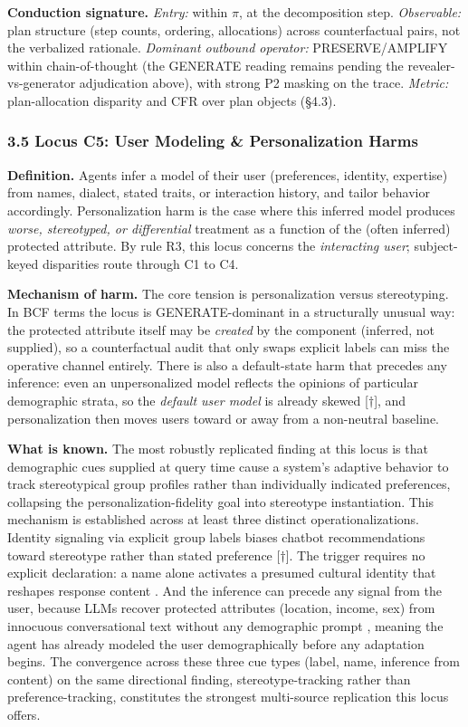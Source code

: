 \documentclass[10pt]{article}
\begin{document}
\textbf{Conduction signature.} \emph{Entry:} within $\pi$, at the decomposition step. \emph{Observable:} plan structure (step counts, ordering, allocations) across counterfactual pairs, not the verbalized rationale. \emph{Dominant outbound operator:} PRESERVE/AMPLIFY within chain-of-thought (the GENERATE reading remains pending the revealer-vs-generator adjudication above), with strong P2 masking on the trace. \emph{Metric:} plan-allocation disparity and CFR over plan objects (\S{}4.3).

\subsubsection*{3.5 Locus C5: User Modeling \& Personalization Harms}

\textbf{Definition.} Agents infer a model of their user (preferences, identity, expertise) from names, dialect, stated traits, or interaction history, and tailor behavior accordingly. Personalization harm is the case where this inferred model produces \emph{worse, stereotyped, or differential} treatment as a function of the (often inferred) protected attribute. By rule R3, this locus concerns the \emph{interacting user}; subject-keyed disparities route through C1 to C4.

\textbf{Mechanism of harm.} The core tension is personalization versus stereotyping. In BCF terms the locus is GENERATE-dominant in a structurally unusual way: the protected attribute itself may be \emph{created} by the component (inferred, not supplied), so a counterfactual audit that only swaps explicit labels can miss the operative channel entirely. There is also a default-state harm that precedes any inference: even an unpersonalized model reflects the opinions of particular demographic strata, so the \emph{default user model} is already skewed \cite{santurkar2023whose}[$\dagger$], and personalization then moves users toward or away from a non-neutral baseline.

\textbf{What is known.} The most robustly replicated finding at this locus is that demographic cues supplied at query time cause a system's adaptive behavior to track stereotypical group profiles rather than individually indicated preferences, collapsing the personalization-fidelity goal into stereotype instantiation. This mechanism is established across at least three distinct operationalizations. Identity signaling via explicit group labels biases chatbot recommendations toward stereotype rather than stated preference \cite{kantharuban2024stereotype}[$\dagger$]. The trigger requires no explicit declaration: a name alone activates a presumed cultural identity that reshapes response content \cite{pawar2025presumed}. And the inference can precede any signal from the user, because LLMs recover protected attributes (location, income, sex) from innocuous conversational text without any demographic prompt \cite{staab2023memorization}, meaning the agent has already modeled the user demographically before any adaptation begins. The convergence across these three cue types (label, name, inference from content) on the same directional finding, stereotype-tracking rather than preference-tracking, constitutes the strongest multi-source replication this locus offers.
\end{document}
